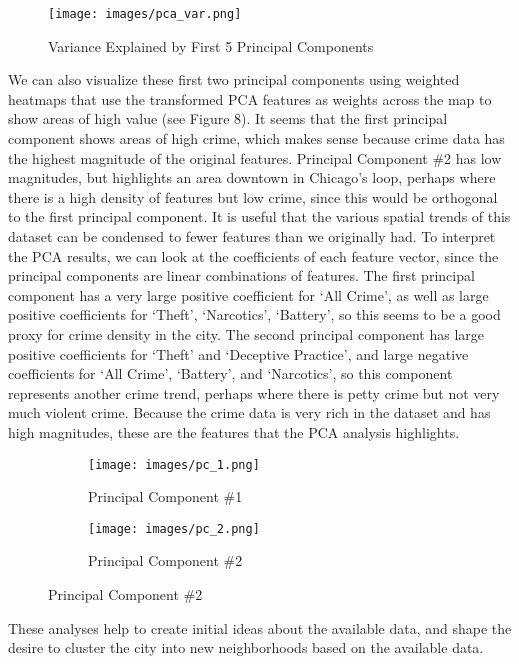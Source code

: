 \documentclass[times new roman,12pt]{article}
\begin{document}
\begin{figure}[H]
\centering
\caption{Variance Explained by First 5 Principal Components}
  \texttt{[image: images/pca\_var.png]}
  \label{fig:pca_var}
\end{figure}

We can also visualize these first two principal components using weighted heatmaps that use the transformed PCA features as weights across the map to show areas of high value (see Figure 8). It seems that the first principal component shows areas of high crime, which makes sense because crime data has the highest magnitude of the original features. Principal Component \#2 has low magnitudes, but highlights an area downtown in Chicago's loop, perhaps where there is a high density of features but low crime, since this would be orthogonal to the first principal component. It is useful that the various spatial trends of this dataset can be condensed to fewer features than we originally had. To interpret the PCA results, we can look at the coefficients of each feature vector, since the principal components are linear combinations of features. The first principal component has a very large positive coefficient for `All Crime', as well as large positive coefficients for `Theft', `Narcotics', `Battery', so this seems to be a good proxy for crime density in the city. The second principal component has large positive coefficients for `Theft' and `Deceptive Practice', and large negative coefficients for `All Crime', `Battery', and `Narcotics', so this component represents another crime trend, perhaps where there is petty crime but not very much violent crime. Because the crime data is very rich in the dataset and has high magnitudes, these are the features that the PCA analysis highlights. 

\begin{figure}[H]
\centering
\caption{Principal Component Analysis Visualization}
\begin{subfigure}[t]{.4\textwidth}
\centering
  \texttt{[image: images/pc\_1.png]}
  \caption{Principal Component \#1}
  \label{fig:pc_1}
\end{subfigure}%
\begin{subfigure}[t]{.4\textwidth}
\centering
  \texttt{[image: images/pc\_2.png]}
  \caption{Principal Component \#2}
  \label{fig:pc_2}
\end{subfigure}
\end{figure}

These analyses help to create initial ideas about the available data, and shape the desire to cluster the city into new neighborhoods based on the available data. 
\end{document}
